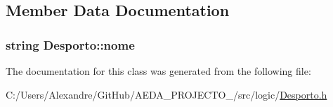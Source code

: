 \subsection{Member Data Documentation}
\hypertarget{class_desporto_ad7ccd705ac44cd574cbe1290a698d040}{}
\subsubsection[{nome}]{\setlength{\rightskip}{0pt plus 5cm}string Desporto\+::nome\hspace{0.3cm}{\ttfamily [private]}}\label{class_desporto_ad7ccd705ac44cd574cbe1290a698d040}


The documentation for this class was generated from the following file\+:\begin{DoxyCompactItemize}
\item 
C\+:/\+Users/\+Alexandre/\+Git\+Hub/\+A\+E\+D\+A\+\_\+\+P\+R\+O\+J\+E\+C\+T\+O\+\_/src/logic/\hyperlink{_desporto_8h}{Desporto.\+h}\end{DoxyCompactItemize}
